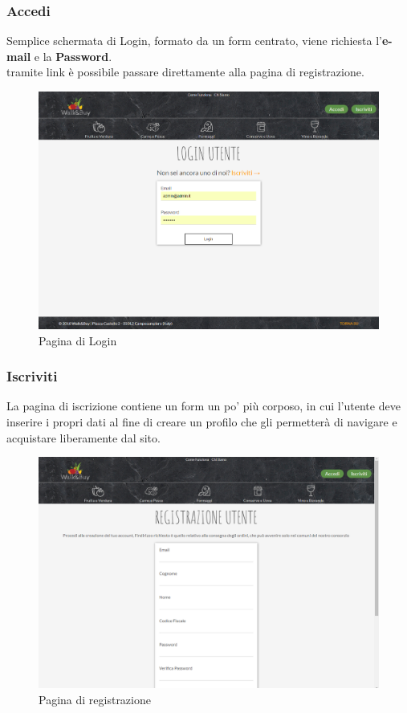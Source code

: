 \subsubsection{Accedi}
Semplice schermata di Login, formato da un form centrato, viene richiesta l'\textbf{e-mail} e la \textbf{Password}.\\
tramite link è possibile passare direttamente alla pagina di registrazione.
	\begin{figure}[H]
	\includegraphics[width=\linewidth]{res/img/login}
	\caption{Pagina di Login}
	\label{Pagina di Login}
\end{figure}
\newpage
\subsubsection{Iscriviti}
La pagina di iscrizione contiene un form un po' più corposo, in cui l'utente deve inserire i propri dati al fine di creare un profilo che gli permetterà di navigare e acquistare liberamente dal sito.
\begin{figure}[H]
	\includegraphics[width=\linewidth]{res/img/registrazione}
	\caption{Pagina di registrazione}
	\label{Pagina di registrazione}
\end{figure}
